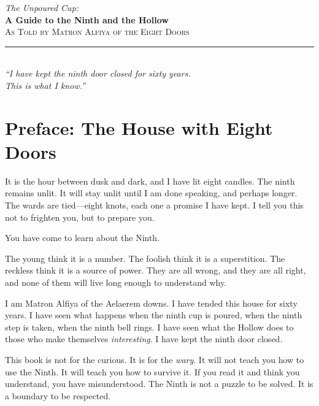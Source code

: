 \documentclass[11pt]{book}
\begin{document}


\frontmatter

\thispagestyle{empty}
\vspace*{4cm}
\begin{center}
{\LARGE\itshape\color{wardgray} The Unpoured Cup:}\\[0.5cm]
{\Huge\bfseries\color{wardgray} A Guide to the Ninth and the Hollow}\\[1cm]
{\large\scshape\color{candleglow} As Told by Matron Alfiya of the Eight Doors}\\[0.5cm]
\rule{8cm}{0.5pt}\\[0.5cm]
{\small\itshape\color{wardgray} ``I have kept the ninth door closed for sixty years.}\\
{\small\itshape\color{wardgray} This is what I know.''}
\end{center}
\vspace*{2cm}
\clearpage

\chapter*{Preface: The House with Eight Doors}

It is the hour between dusk and dark, and I have lit eight candles. The ninth remains unlit. It will stay unlit until I am done speaking, and perhaps longer. The wards are tied---eight knots, each one a promise I have kept. I tell you this not to frighten you, but to prepare you.

You have come to learn about the Ninth.

The young think it is a number. The foolish think it is a superstition. The reckless think it is a source of power. They are all wrong, and they are all right, and none of them will live long enough to understand why.

I am Matron Alfiya of the Aelaerem downs. I have tended this house for sixty years. I have seen what happens when the ninth cup is poured, when the ninth step is taken, when the ninth bell rings. I have seen what the Hollow does to those who make themselves \textit{interesting}. I have kept the ninth door closed.

This book is not for the curious. It is for the \textit{wary}. It will not teach you how to use the Ninth. It will teach you how to survive it. If you read it and think you understand, you have misunderstood. The Ninth is not a puzzle to be solved. It is a boundary to be respected.
\end{document}
